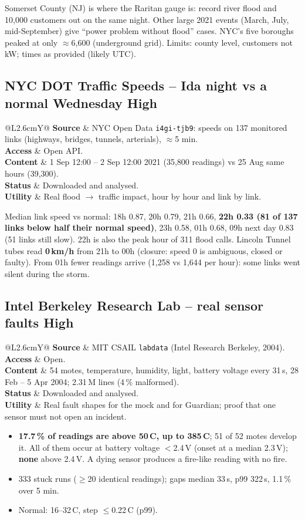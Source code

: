 \documentclass[10pt,a4paper]{article}
\makeatletter
\newcommand{\code}[1]{\texttt{#1}}
\newcommand{\HIGH}{\textbf{\textcolor{hi}{High}}}
\newcommand{\facts}[5]{%
\noindent\begin{tabularx}{\textwidth}{@{}L{2.6cm}Y@{}}
\textbf{Source} & #1\\
\textbf{Access} & #2\\
\textbf{Content} & #3\\
\textbf{Status} & #4\\
\textbf{Utility} & #5\\
\end{tabularx}\par\smallskip}
\makeatother
\begin{document}
Somerset County (NJ) is where the Raritan gauge is: record river flood and 10,000 customers out on the same night. Other large 2021 events (March, July, mid-September) give ``power problem without flood'' cases. NYC's five boroughs peaked at only $\approx$6,600 (underground grid). Limits: county level, customers not kW; times as provided (likely UTC).

\subsection{NYC DOT Traffic Speeds -- Ida night vs a normal Wednesday \hfill \HIGH}
\facts{NYC Open Data \code{i4gi-tjb9}: speeds on 137 monitored links (highways, bridges, tunnels, arterials), $\approx$5 min.}
{Open API.}
{1 Sep 12:00 -- 2 Sep 12:00 2021 (35,800 readings) vs 25 Aug same hours (39,300).}
{Downloaded and analysed.}
{Real flood $\rightarrow$ traffic impact, hour by hour and link by link.}

Median link speed vs normal: 18h 0.87, 20h 0.79, 21h 0.66, \textbf{22h 0.33 (81 of 137 links below half their normal speed)}, 23h 0.58, 01h 0.68, 09h next day 0.83 (51 links still slow). 22h is also the peak hour of 311 flood calls. Lincoln Tunnel tubes read \textbf{0\,km/h} from 21h to 00h (closure: speed 0 is ambiguous, closed or faulty). From 01h fewer readings arrive (1,258 vs 1,644 per hour): some links went silent during the storm.

\subsection{Intel Berkeley Research Lab -- real sensor faults \hfill \HIGH}
\facts{MIT CSAIL \code{labdata} (Intel Research Berkeley, 2004).}
{Open.}
{54 motes, temperature, humidity, light, battery voltage every 31\,s, 28 Feb -- 5 Apr 2004; 2.31\,M lines (4\,\% malformed).}
{Downloaded and analysed.}
{Real fault shapes for the mock and for Guardian; proof that one sensor must not open an incident.}

\begin{itemize}
\item \textbf{17.7\,\% of readings are above 50\,\textdegree C, up to 385\,\textdegree C}; 51 of 52 motes develop it. All of them occur at battery voltage $<$2.4\,V (onset at a median 2.3\,V); \textbf{none} above 2.4\,V. A dying sensor produces a fire-like reading with no fire.
\item 333 stuck runs ($\geq$20 identical readings); gaps median 33\,s, p99 322\,s, 1.1\,\% over 5 min.
\item Normal: 16--32\,\textdegree C, step $\leq$0.22\,\textdegree C (p99).
\end{itemize}
\end{document}
